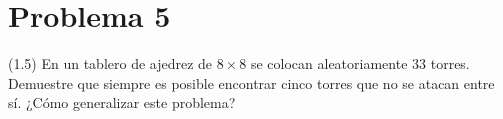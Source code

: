 
\section*{Problema 5}
(1.5) En un tablero de ajedrez de $8\times8$ se colocan aleatoriamente 33 torres. Demuestre que siempre es posible encontrar cinco torres que no se atacan entre sí. ¿Cómo generalizar este problema?

